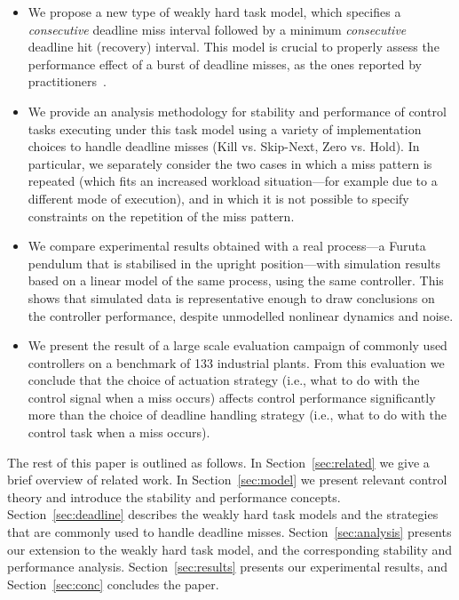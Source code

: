 \begin{itemize}
    \item We propose a new type of weakly hard task model, which specifies a \emph{consecutive} deadline miss interval followed by a minimum \emph{consecutive} deadline hit (recovery) interval.
        This model is crucial to properly assess the performance effect of a burst of deadline misses, as the ones reported by practitioners~\cite{Akesson:2020}.

    \item We provide an analysis methodology for stability and performance of control tasks executing under this task model using a variety of implementation choices to handle deadline misses (Kill vs.
        Skip-Next, Zero vs. Hold).
        In particular, we separately consider the two cases in which a miss pattern is repeated (which fits an increased workload situation---for example due to a different mode of execution), and in which it is not possible to specify constraints on the repetition of the miss pattern.

    \item We compare experimental results obtained with a real process---a Furuta pendulum that is stabilised in the upright position---with simulation results based on a linear model of the same process, using the same controller. 
        This shows that simulated data is representative enough to draw conclusions on the controller performance, despite unmodelled nonlinear dynamics and noise.

    \item We present the result of a large scale evaluation campaign of commonly used controllers on a benchmark of 133 industrial plants.
        From this evaluation we conclude that the choice of actuation strategy (i.e., what to do with the control signal when a miss occurs) affects control performance significantly more than the choice of deadline handling strategy (i.e., what to do with the control task when a miss occurs).

\end{itemize}

The rest of this paper is outlined as follows.
In Section~\ref{sec:related} we give a brief overview of related work.
In Section~\ref{sec:model} we present relevant control theory and introduce the stability and performance concepts.
Section~\ref{sec:deadline} describes the weakly hard task models and the strategies that are commonly used to handle deadline misses.
Section~\ref{sec:analysis} presents our extension to the weakly hard task model, and the corresponding stability and performance analysis.
Section~\ref{sec:results} presents our experimental results, and Section~\ref{sec:conc} concludes the paper.
